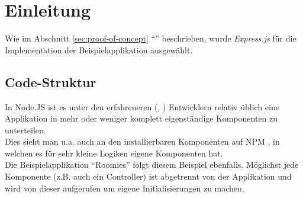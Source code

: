 \section{Einleitung}

Wie im Abschnitt \ref{sec:proof-of-concept} ``'' beschrieben, wurde \emph{Express.js} \cite{Expressjs} für
die Implementation der Beispielapplikation ausgewählt.

\subsection{Code-Struktur}
In Node.JS ist es unter den erfahreneren (\cite{TJH_ComponentStructure}, \cite{IZS_ComponentStructure}) Entwicklern relativ üblich eine Applikation in mehr oder weniger komplett eigenständige Komponenten zu unterteilen.\\
Dies sieht man u.a. auch an den installierbaren Komponenten auf NPM \cite{NPM}, in welchen es für sehr kleine Logiken eigene Komponenten hat.\\
Die Beispielapplikation ``Roomies'' folgt diesem Beispiel ebenfalls. Möglichst jede Komponente (z.B. auch ein Controller) ist abgetrennt von der Applikation und wird von dieser aufgerufen um eigene Initialisierungen zu machen.\\[0.5mm]

